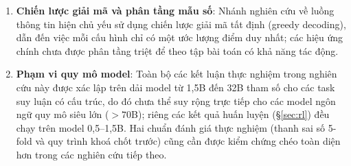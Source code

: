 \documentclass[11pt,a4paper]{article}
\begin{document}
\begin{enumerate}
      đủ độ nhạy thống kê để xác lập chắc chắn trên tập MBPP; ngưỡng đổi dấu $g^\ast$ chưa được gắn
      khoảng tin cậy tham số.
\item \textbf{Chiến lược giải mã và phân tầng mẫu số}: Nhánh nghiên cứu về luồng thông tin hiện chủ
      yếu sử dụng chiến lược giải mã tất định (greedy decoding), dẫn đến việc mỗi cấu hình chỉ có một
      ước lượng điểm duy nhất; các hiệu ứng chính chưa được phân tầng triệt để theo tập bài toán có
      khả năng tác động.
\item \textbf{Phạm vi quy mô model}: Toàn bộ các kết luận thực nghiệm trong nghiên cứu này được xác
      lập trên dải model từ 1,5B đến 32B tham số cho các task suy luận có cấu trúc, do đó chưa thể
      suy rộng trực tiếp cho các model ngôn ngữ quy mô siêu lớn ($>70$B); riêng các kết quả huấn
      luyện (\S\ref{sec:rl}) đều chạy trên model 0,5--1,5B. Hai chuẩn đánh giá thực
      nghiệm (thanh sai số 5-fold và quy trình khoá chốt trước) cũng cần được kiểm chứng chéo toàn
      diện hơn trong các nghiên cứu tiếp theo.
\end{enumerate}
\end{document}
